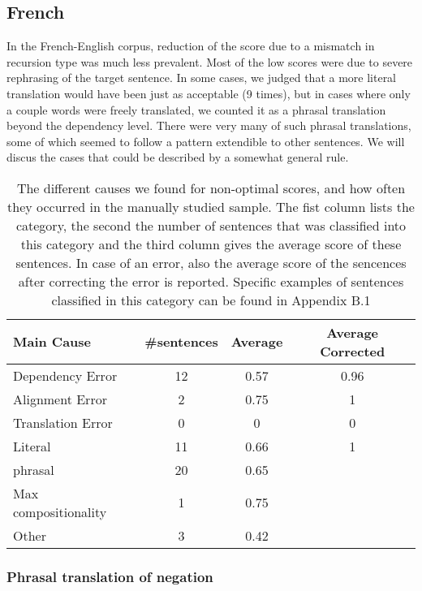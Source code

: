 \subsection{French}

In the French-English corpus, reduction of the score due to a mismatch in recursion type was much less prevalent. Most of the low scores were due to severe rephrasing of the target sentence. In some cases, we judged that a more literal translation would have been just as acceptable (9 times), but in cases where only a couple words were freely translated, we counted it as a phrasal translation beyond the dependency level. There were very many of such phrasal translations, some of which seemed to follow a pattern extendible to other sentences. We will discus the cases that could be described by a somewhat general rule.

\begin{table}[!ht]
\centering
\begin{tabular}{|l|c|c|c|}
\hline
\textbf{Main Cause} & \textbf{\#sentences} & \textbf{Average} & \textbf{Average Corrected}\\
\hline \hline
Dependency Error & 12 & 0.57 & 0.96\\
\hline
Alignment Error & 2 & 0.75 & 1\\
\hline
Translation Error & 0 & 0 & 0 \\
\hline
Literal & 11 & 0.66  & 1\\
\hline
phrasal& 20 & 0.65 \\
\cline{1-3}
Max compositionality & 1 & 0.75\\
\cline{1-3}
Other & 3 & 0.42\\
\cline{1-3}
\end{tabular}
\caption{The different causes we found for non-optimal scores, and how often they occurred in the manually studied sample. The fist column lists the category, the second the number of sentences that was classified into this category and the third column gives the average score of these sentences. In case of an error, also the average score of the sencences after correcting the error is reported. Specific examples of sentences classified in this category can be found in Appendix B.1}\label{tab:non_optimal2}
\end{table}

\subsubsection{Phrasal translation of negation}

